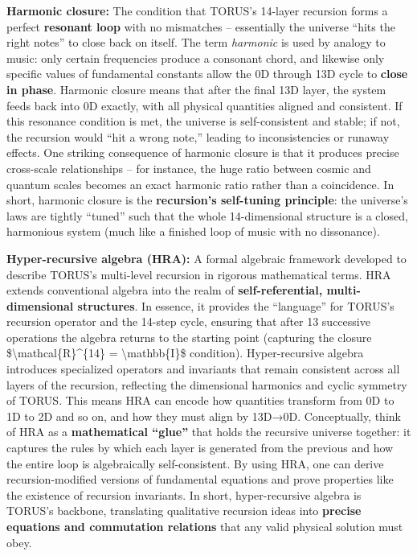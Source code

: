 \documentclass[
]{article}
\begin{document}
\textbf{Harmonic closure:} The condition that TORUS's 14-layer recursion
forms a perfect \textbf{resonant loop} with no mismatches -- essentially
the universe ``hits the right notes'' to close back on itself. The term
\emph{harmonic} is used by analogy to music: only certain frequencies
produce a consonant chord, and likewise only specific values of
fundamental constants allow the 0D through 13D cycle to \textbf{close in
phase}\hspace{0pt}. Harmonic closure means that after the final 13D
layer, the system feeds back into 0D exactly, with all physical
quantities aligned and consistent\hspace{0pt}. If this resonance
condition is met, the universe is self-consistent and stable; if not,
the recursion would ``hit a wrong note,'' leading to inconsistencies or
runaway effects. One striking consequence of harmonic closure is that it
produces precise cross-scale relationships -- for instance, the huge
ratio between cosmic and quantum scales becomes an exact harmonic ratio
rather than a coincidence\hspace{0pt}. In short, harmonic closure is the
\textbf{recursion's self-tuning principle}: the universe's laws are
tightly ``tuned'' such that the whole 14-dimensional structure is a
closed, harmonious system (much like a finished loop of music with no
dissonance).

\textbf{Hyper-recursive algebra (HRA):} A formal algebraic framework
developed to describe TORUS's multi-level recursion in rigorous
mathematical terms. HRA extends conventional algebra into the realm of
\textbf{self-referential, multi-dimensional structures}\hspace{0pt}. In
essence, it provides the ``language'' for TORUS's recursion operator and
the 14-step cycle, ensuring that after 13 successive operations the
algebra returns to the starting point (capturing the closure
\$\textbackslash mathcal\{R\}\^{}\{14\} = \textbackslash mathbb\{I\}\$
condition)\hspace{0pt}. Hyper-recursive algebra introduces specialized
operators and invariants that remain consistent across all layers of the
recursion, reflecting the dimensional harmonics and cyclic symmetry of
TORUS\hspace{0pt}. This means HRA can encode how quantities transform
from 0D to 1D to 2D and so on, and how they must align by 13D→0D.
Conceptually, think of HRA as a \textbf{mathematical ``glue''} that
holds the recursive universe together: it captures the rules by which
each layer is generated from the previous and how the entire loop is
algebraically self-consistent. By using HRA, one can derive
recursion-modified versions of fundamental equations and prove
properties like the existence of recursion invariants. In short,
hyper-recursive algebra is TORUS's backbone, translating qualitative
recursion ideas into \textbf{precise equations and commutation
relations} that any valid physical solution must obey.
\end{document}
